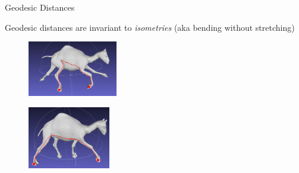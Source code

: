 \documentclass{beamer}
\begin{document}
\begin{frame}{Geodesic Distances}

Geodesic distances are invariant to {\em isometries} (aka bending without stretching)
\begin{figure}[t]
    \includegraphics[width=0.35\textwidth]{camel1_geodesic.png}
\end{figure}

\begin{figure}[t]
    \includegraphics[width=0.32\textwidth]{camel2_geodesic.png}
\end{figure}


\end{frame}
\end{document}
